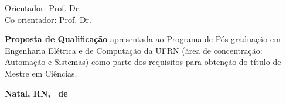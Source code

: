 \begin{titlepage}
\begin{center}

\LARGE
\textbf{\titulo}

\vfill

\Large
\textbf{\autor}

\vfill

\normalsize
Orientador: Prof. Dr. \orientador
\\[2ex] Co orientador: Prof. Dr. \coorientador

\vfill

\hfill
\parbox{0.5\linewidth}{\textbf{Proposta de Qualificação} apresentada ao Programa
de Pós-graduação em Engenharia Elétrica e de Computação da UFRN (área de
concentração: Automação e Sistemas) como parte dos requisitos para obtenção do
título de Mestre em Ciências.}

\vfill

\large
\textbf{Natal, RN, \Mesaprovacao\ de \Anoaprovacao}

\end{center}

\end{titlepage}
